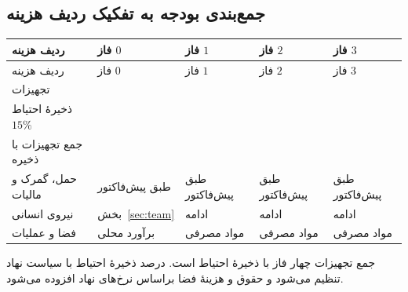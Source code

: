 \subsection{جمع‌بندی بودجه به تفکیک ردیف هزینه}
\begin{longtable}{R{3.2cm}C{2.3cm}C{2.3cm}C{3.2cm}C{3.2cm}}
\toprule {} ردیف هزینه & فاز $0$ & فاز $1$ & فاز $2$ & فاز $3$ \\ \midrule
\endfirsthead
\toprule {} ردیف هزینه & فاز $0$ & فاز $1$ & فاز $2$ & فاز $3$ \\ \midrule
\endhead
تجهیزات &  &  &  &  \\
ذخیرهٔ احتیاط $15\%$ &  &  &  &  \\
جمع تجهیزات با ذخیره &  &  &  &  \\
حمل، گمرک و مالیات & طبق پیش‌فاکتور & طبق پیش‌فاکتور & طبق پیش‌فاکتور & طبق پیش‌فاکتور \\
نیروی انسانی & بخش~\ref{sec:team} & ادامه & ادامه & ادامه \\
فضا و عملیات & برآورد محلی & مواد مصرفی & مواد مصرفی & مواد مصرفی \\
\bottomrule\end{longtable}
جمع تجهیزات چهار فاز با ذخیرهٔ احتیاط  است. درصد ذخیرهٔ احتیاط با سیاست نهاد تنظیم می‌شود و حقوق و هزینهٔ فضا براساس نرخ‌های نهاد افزوده می‌شود.
